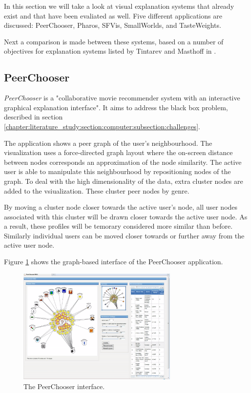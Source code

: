 In this section we will take a look at visual explanation systems that already exist and that have been evaliated as well. Five different applications are discussed: PeerChooser, Pharos, SFVis, SmallWorlds, and TasteWeights.

Next a comparison is made between these systems, based on a number of objectives for explanation systems listed by Tintarev and Masthoff in \cite{tintarev:2007:SER:1547550.1547664}.


\subsection{PeerChooser}\label{chapter:survey:section:applications:subsection:peerchooser}

\emph{PeerChooser} is a "collaborative movie recommender system with an interactive graphical explanation interface"\cite{odonovan:2008}. It aims to address the black box problem, described in section \ref{chapter:literature_study:section:computer:subsection:challenges}\cite{odonovan:2008}.

The application shows a peer graph of the user's neighbourhood. The visualization uses a force-directed graph layout where the on-screen distance between nodes corresponds an approximation of the node similarity. The active user is able to manipulate this neighbourhood by repositioning nodes of the graph. To deal with the high dimensionality of the data, extra cluster nodes are added to the vsiualization. These cluster peer nodes by genre\cite{odonovan:2008}.

By moving a cluster node closer towards the active user's node, all user nodes associated with this cluster will be drawn closer towards the active user node. As a result, these profiles will be temorary considered more similar than before. Similarly individual users can be moved closer towards or further away from the active user node\cite{odonovan:2008}.

Figure \ref{figure:peerchooser} shows the graph-based interface of the PeerChooser application.

\begin{figure}%
	\begin{center}
		\includegraphics[width=300px]{img/peerchooser}%
	\end{center}
	\caption{The PeerChooser interface.}%
	\label{figure:peerchooser}%
\end{figure}



